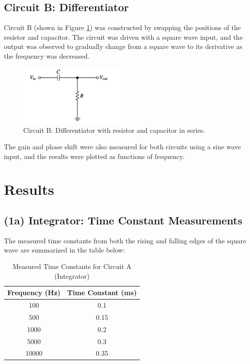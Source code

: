 \documentclass{article}
\begin{document}
\subsection{Circuit B: Differentiator}
Circuit B (shown in Figure \ref{fig:circuitB}) was constructed by swapping the 
positions of the resistor and capacitor. The circuit was driven with a square wave 
input, and the output was observed to gradually change from a square wave to its 
derivative as the frequency was decreased.

\begin{figure}[H]
    \centering
    \includegraphics[width=0.5\textwidth]{./img/Lab2_curcuitB.png}  %
    \caption{Circuit B: Differentiator with resistor and capacitor in series.}
    \label{fig:circuitB}
\end{figure}

The gain and phase shift were also measured for both circuits using a sine wave input, 
and the results were plotted as functions of frequency.

\section{Results}

\subsection{ (1a) Integrator: Time Constant Measurements}
The measured time constants from both the rising and falling edges of the square wave are 
summarized in the table below:

\begin{table}[H]
\centering
\caption{Measured Time Constants for Circuit A (Integrator)}
\begin{tabular}{|c|c|}
\hline
Frequency (Hz) & Time Constant (ms) \\ \hline
100            & 0.1                \\ \hline
500            & 0.15               \\ \hline
1000           & 0.2                \\ \hline
5000           & 0.3                \\ \hline
10000          & 0.35               \\ \hline
\end{tabular}
\end{table}
\end{document}
